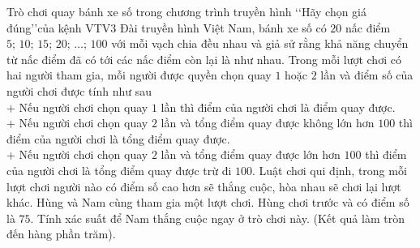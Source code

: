 \begin{ex}%
	Trò chơi quay bánh xe số trong chương trình truyền hình \lq\lq  Hãy chọn giá đúng\rq\rq của kệnh VTV3 Đài truyền hình Việt Nam, bánh xe số có $20$ nấc điểm $5; \, 10; \, 15; \, 20; \, \ldots ; \, 100$ với mỗi vạch chia đều nhau và giả sử rằng khả năng chuyển từ nấc điểm đã có tới các nấc điểm còn lại là như nhau. Trong mỗi lượt chơi có hai người tham gia, mỗi người được quyền chọn quay $1$ hoặc $2$ lần và điểm số của người chơi được tính như sau \\
	+ Nếu người chơi chọn quay $1$ lần thì điểm của người chơi là điểm quay được.\\
	+ Nếu người chơi chọn quay $2$ lần và tổng điểm quay được không lớn hơn $100$ thì điểm của người chơi là tổng điểm quay được. \\
	+ Nếu người chơi chọn quay $2$ lần và tổng điểm quay được lớn hơn $100$ thì điểm của người chơi là tổng điểm quay được trừ đi $100$. Luật chơi qui định, trong mỗi lượt chơi người nào có điểm số cao hơn sẽ thắng cuộc, hòa nhau sẽ chơi lại lượt khác. Hùng và Nam cùng tham gia một lượt chơi. Hùng chơi trước và có điểm số là $75$. Tính xác suất để Nam thắng cuộc ngay ở trò chơi này. (Kết quả làm tròn đến hàng phần trăm).
	
\end{ex}
